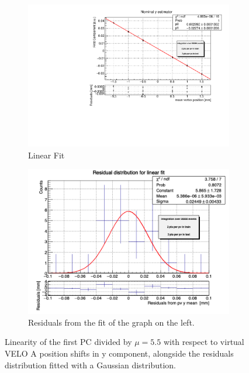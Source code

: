 \begin{figure}
    \centering
    \begin{subfigure}{0.48\textwidth}
    \includegraphics[width=\linewidth]{figures/y_fit_veloA_MC_normalised.pdf}
    \caption{Linear Fit}\label{fig:y_veloA_fit_MC}
    \end{subfigure}
    \begin{subfigure}{0.48\textwidth}
    \includegraphics[width=\linewidth]{figures/y_res_veloA_MC.png}
    \caption{Residuals from the fit of the graph on the left. }\label{fig:y_veloA_res_MC}
    \end{subfigure}
    \caption{Linearity of the first PC divided by $\mu=5.5$ with respect to virtual VELO A position shifts in y component, alongside the residuals distribution fitted with a Gaussian distribution.}
    \label{fig:y_veloA_MC}
\end{figure}

